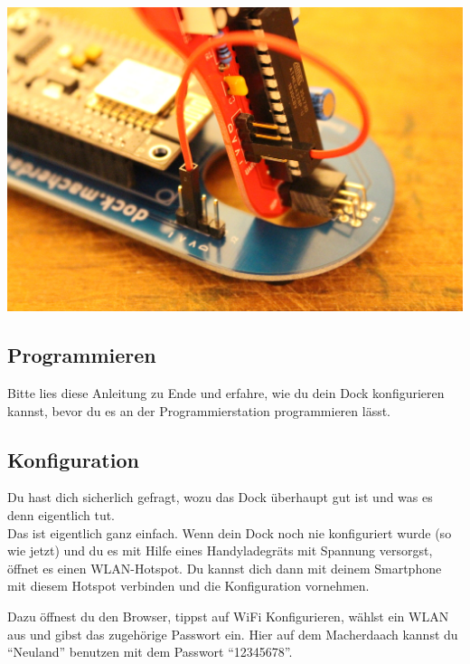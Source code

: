 \documentclass{article}
\begin{document}
\vspace{1cm}

\begin{minipage}[b]{0.5\textwidth}
	\includegraphics[width=\textwidth]{Bilder2019/IMG_6490.JPG}
\end{minipage}

\subsection{Programmieren}

Bitte lies diese Anleitung zu Ende und erfahre, wie du dein Dock konfigurieren kannst, bevor du es an der Programmierstation programmieren lässt.

\subsection{Konfiguration}

Du hast dich sicherlich gefragt, wozu das Dock überhaupt gut ist und was es denn eigentlich tut.\\

Das ist eigentlich ganz einfach. Wenn dein Dock noch nie konfiguriert wurde (so wie jetzt) und du es mit Hilfe eines Handyladegräts mit Spannung versorgst, öffnet es einen WLAN-Hotspot. Du kannst dich dann mit deinem Smartphone mit diesem Hotspot verbinden und die Konfiguration vornehmen.

Dazu öffnest du den Browser, tippst auf WiFi Konfigurieren, wählst ein WLAN aus und gibst das zugehörige Passwort ein.
Hier auf dem Macherdaach kannst du "`Neuland"' benutzen mit dem Passwort "`12345678"'.
\end{document}
